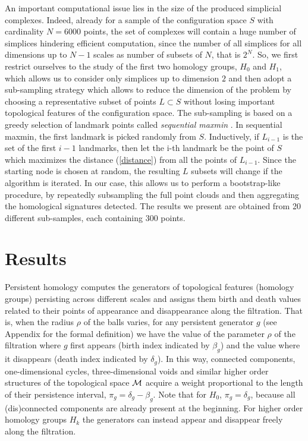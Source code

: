 \documentclass[preprintnumbers,showpacs, showkeys, twocolumn,secnumarabic,amssymb,amsmath,amsfonts,aps, pre]{revtex4-1}
\begin{document}
An important computational issue lies in the size of the produced simplicial complexes. 
Indeed, already for a sample of the configuration space $S$ with cardinality $N=6000$ points, the set of complexes will contain a huge number of simplices hindering efficient computation, since the number of all simplices for all dimensions up to $N-1$ scales as number of subsets of $N$, that is $2^N$.   
So, we first restrict ourselves to the study of the first two homology groups, $H_0$ and $H_1$, which allows us to consider only simplices up to dimension $2$ and then adopt a sub-sampling strategy which allows to reduce the dimension of the problem by choosing a representative subset of points $L\subset S$ without losing important topological features of the configuration space.
The sub-sampling is based on a greedy selection of landmark points called \textit{sequential maxmin} \cite{DeSilva:2005,gamble}.
In sequential maxmin, the first landmark is picked randomly from $S$. 
Inductively, if $L_{i-1} $ is the set of the first $i-1$ landmarks, then let the i-th landmark be the point of $S$ which maximizes the distance (\ref{distance}) from all the points of $L_{i-1} $.
Since the starting node is chosen at random, the resulting $L$ subsets will change if the algorithm is iterated. 
In our case, this allows us to perform a bootstrap-like procedure, by repeatedly subsampling the full point clouds and then aggregating the homological signatures detected. The results we present are obtained from 20 different sub-samples, each containing 300 points. 


\section{Results}

Persistent homology computes the generators of topological features (homology groups) persisting across different scales and assigns them birth and death values related to their points of appearance and disappearance along the filtration.  
That is, when the radius $\rho$ of the balls varies, for any persistent generator $g$  (see Appendix for the formal definition) we have the value of the parameter  $\rho$ of the filtration where $g$ first appears (birth index indicated by $\beta_{g}$) and  the value where it disappears (death index indicated by $\delta_{g}$).
In this way, connected components, one-dimensional cycles, three-dimensional voids and similar higher order structures of the topological space ${\cal M}$ acquire a weight proportional to the length of their  persistence interval, $\pi_g  = \delta_g - \beta_g$.
Note that for $H_0$, $\pi_g = \delta_g$, because all (dis)connected components are already present at the beginning.  
For higher order homology groups $H_k$ the generators can instead appear and disappear freely along the filtration.
\end{document}
